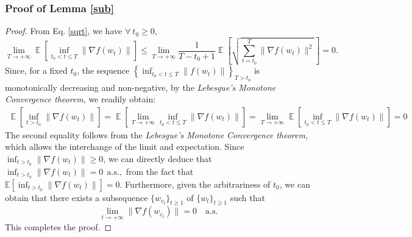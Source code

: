 \documentclass{article} %
\DeclareMathOperator{\Expect}{\mathbb{E}}
\begin{document}
\subsubsection{Proof of Lemma \ref{sub}}
\begin{proof}
From Eq. \eqref{sqrt}, we have $\forall\ t_{0}\ge 0,$
\[
\lim_{T\rightarrow+\infty}\Expect\left[\inf_{t_0< t\le T}\|\nabla f(w_{t})\|\right] \le \lim_{T\rightarrow+\infty}\frac{1}{T-t_0+1}\Expect\left[\sqrt{\sum_{t=t_0}^{T}\|\nabla f(w_{t})\|^{2}}\right]=0.
\]
Since, for a fixed \( t_0 \), the sequence \( \left\{ \inf_{t_0 < t \leq T} \|f(w_t)\| \right\}_{T > t_0} \) is monotonically decreasing and non-negative, by the \emph{Lebesgue's Monotone Convergence theorem}, we readily obtain:
\begin{align*}
    \Expect\left[\inf_{t>t_{0}}\|\nabla f(w_{t})\|\right]= \Expect\left[\lim_{T\rightarrow+\infty}\inf_{t_{0}<t\le T}\|\nabla f(w_{t})\|\right]=\lim_{T\rightarrow+\infty}\Expect\left[\inf_{t_{0}<t\le T}\|\nabla f(w_{t})\|\right]=0
\end{align*}
The second equality follows from the \emph{Lebesgue's Monotone Convergence theorem}, which allows the interchange of the limit and expectation. Since \(\inf_{t > t_0} \|\nabla f(w_t)\| \geq 0\), we can directly deduce that 
\(\inf_{t > t_0} \|\nabla f(w_t)\| = 0\ \ \text{a.s.},\)
from the fact that 
\(\mathbb{E}\left[\inf_{t > t_0} \|\nabla f(w_t)\|\right] = 0.\)
Furthermore, given the arbitrariness of \( t_0 \), we can obtain that there exists a subsequence \( \{w_{c_{t}}\}_{t \ge 1} \) of \( \{w_{t}\}_{t \ge 1} \) such that
\[
\lim_{t \rightarrow +\infty} \|\nabla f(w_{c_{t}})\| = 0 \quad \text{a.s.}
\]
This completes the proof.
\end{proof}
\end{document}
